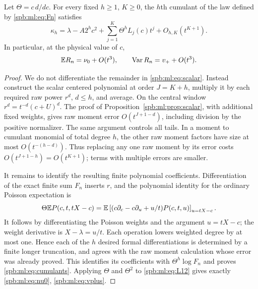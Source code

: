 \begin{theorem}\label{spb:ml:thm:cumulants}
Let $\Theta=c\,d/dc$. For every fixed $h\ge1$, $K\ge0$, the $h$th cumulant of the law defined by \eqref{spb:ml:eq:Fn} satisfies
\begin{equation}\label{spb:ml:eq:cumulants}
 \kappa_h=\lambda-A2^hc^2+
       \sum_{j=1}^K\Theta^hL_j(c)t^j+O_{h,K}(t^{K+1}).
\end{equation}
In particular, at the physical value of $c$,
\begin{equation}\label{spb:ml:eq:meanvar}
 \mathbb E R_n=\nu_0+O(t^3),\qquad \operatorname{Var} R_n=v_++O(t^3).
\end{equation}
\end{theorem}
\begin{proof}
We do not differentiate the remainder in \eqref{spb:ml:eq:scalar}. Instead construct the scalar centered polynomial at order $J=K+h$, multiply it by each required raw power $r^d$, $d\le h$, and average. On the central window $r^d=t^{-d}(c+U)^d$. The proof of Proposition~\ref{spb:ml:prop:scalar}, with additional fixed weights, gives raw moment error $O(t^{J+1-d})$, including division by the positive normalizer. The same argument controls all tails. In a moment to cumulant monomial of total degree $h$, the other raw moment factors have size at most $O(t^{-(h-d)})$. Thus replacing any one raw moment by its error costs $O(t^{J+1-h})=O(t^{K+1})$; terms with multiple errors are smaller.

It remains to identify the resulting finite polynomial coefficients. Differentiation of the exact finite sum $F_n$ inserts $r$, and the polynomial identity for the ordinary Poisson expectation is
\begin{equation}\label{spb:ml:eq:Thetaidentity}
 \Theta\mathbb E P(c,t,tX-c)
 =\mathbb E\left[(c\partial_c-c\partial_u+u/t)P(c,t,u)\right]_{u=tX-c}.
\end{equation}
It follows by differentiating the Poisson weights and the argument $u=tX-c$; the weight derivative is $X-\lambda=u/t$. Each operation lowers weighted degree by at most one. Hence each of the $h$ desired formal differentiations is determined by a finite longer truncation, and agrees with the raw moment calculation whose error was already proved. This identifies its coefficients with $\Theta^h\log F_n$ and proves \eqref{spb:ml:eq:cumulants}. Applying $\Theta$ and $\Theta^2$ to \eqref{spb:ml:eq:L12} gives exactly \eqref{spb:ml:eq:nu0}, \eqref{spb:ml:eq:vplus}.
\end{proof}

